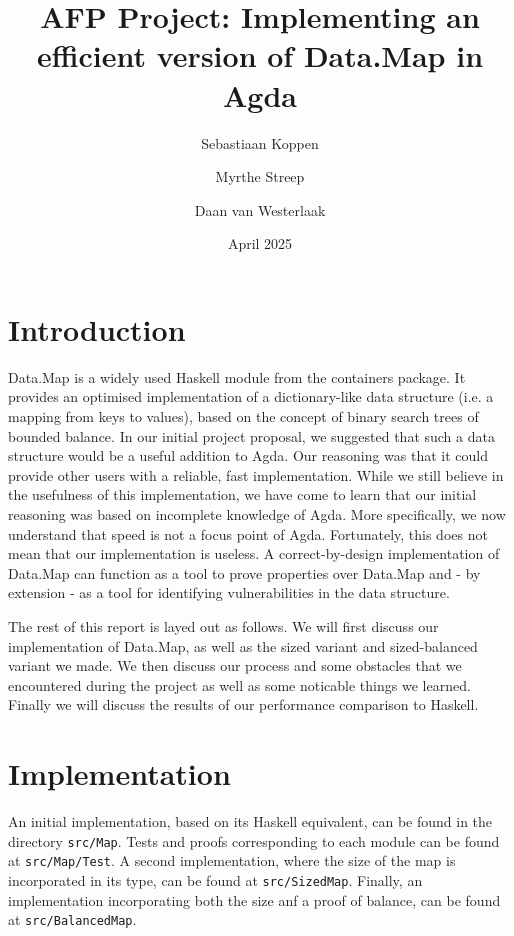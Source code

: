 \documentclass[a4paper,UKenglish,cleveref, autoref, thm-restate]{template/lipics-v2021}
\title{AFP Project: Implementing an efficient version of Data.Map in Agda}
\author{Sebastiaan Koppen}{Utrecht University, Netherlands}{}{}{}
\author{Myrthe Streep}{Utrecht University, Netherlands}{}{}{}
\author{Daan van Westerlaak}{Utrecht University, Netherlands}{}{}{}
\date{April 2025}
\begin{document}
\maketitle

\section{Introduction}
Data.Map is a widely used Haskell module from the containers package. It provides an optimised implementation of a dictionary-like data structure (i.e. a mapping from keys to values), based on the concept of binary search trees of bounded balance. In our initial project proposal, we suggested that such a data structure would be a useful addition to Agda. Our reasoning was that it could provide other users with a reliable, fast implementation. While we still believe in the usefulness of this implementation, we have come to learn that our initial reasoning was based on incomplete knowledge of Agda. More specifically, we now understand that speed is not a focus point of Agda. Fortunately, this does not mean that our implementation is useless. A correct-by-design implementation of Data.Map can function as a tool to prove properties over Data.Map and - by extension - as a tool for identifying vulnerabilities in the data structure.

The rest of this report is layed out as follows. We will first discuss our implementation of Data.Map, as well as the sized variant and sized-balanced variant we made. We then discuss our process and some obstacles that we encountered during the project as well as some noticable things we learned. Finally we will discuss the results of our performance comparison to Haskell.


\section{Implementation}
An initial implementation, based on its Haskell equivalent, can be found in the directory \texttt{src/Map}. Tests and proofs corresponding to each module can be found at \texttt{src/Map/Test}. A second implementation, where the size of the map is incorporated in its type, can be found at \texttt{src/SizedMap}. Finally, an implementation incorporating both the size anf a proof of balance, can be found at \texttt{src/BalancedMap}.
\end{document}

